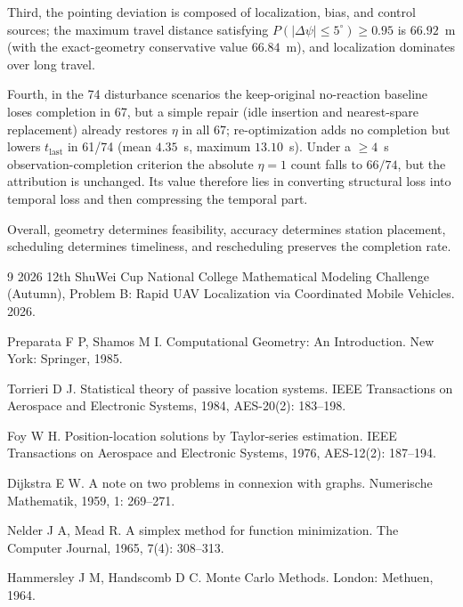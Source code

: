 Third, the pointing deviation is composed of localization, bias, and control sources; the maximum travel distance satisfying $P(|\Delta\psi|\le5^\circ)\ge0.95$ is $66.92$~m (with the exact-geometry conservative value $66.84$~m), and localization dominates over long travel.

Fourth, in the 74 disturbance scenarios the keep-original no-reaction baseline loses completion in 67, but a simple repair (idle insertion and nearest-spare replacement) already restores $\eta$ in all 67; re-optimization adds no completion but lowers $t_{\mathrm{last}}$ in 61/74 (mean $4.35$~s, maximum $13.10$~s). Under a $\ge4$~s observation-completion criterion the absolute $\eta=1$ count falls to $66/74$, but the attribution is unchanged. Its value therefore lies in converting structural loss into temporal loss and then compressing the temporal part.

Overall, geometry determines feasibility, accuracy determines station placement, scheduling determines timeliness, and rescheduling preserves the completion rate.

\clearpage
\begin{thebibliography}{9}
 2026 12th ShuWei Cup National College Mathematical Modeling Challenge (Autumn), Problem B: Rapid UAV Localization via Coordinated Mobile Vehicles. 2026.

 Preparata F P, Shamos M I. Computational Geometry: An Introduction. New York: Springer, 1985.

 Torrieri D J. Statistical theory of passive location systems. IEEE Transactions on Aerospace and Electronic Systems, 1984, AES-20(2): 183--198.

 Foy W H. Position-location solutions by Taylor-series estimation. IEEE Transactions on Aerospace and Electronic Systems, 1976, AES-12(2): 187--194.

 Dijkstra E W. A note on two problems in connexion with graphs. Numerische Mathematik, 1959, 1: 269--271.

 Nelder J A, Mead R. A simplex method for function minimization. The Computer Journal, 1965, 7(4): 308--313.

 Hammersley J M, Handscomb D C. Monte Carlo Methods. London: Methuen, 1964.
\end{thebibliography}
